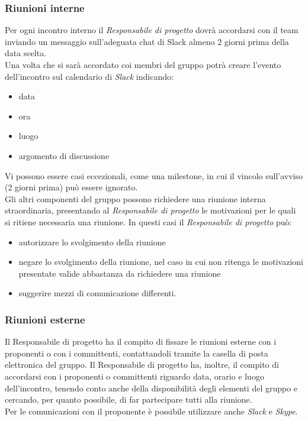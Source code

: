 \subsubsection{Riunioni interne}
Per ogni incontro interno il \emph{ \emph{Responsabile}  di progetto} dovrà
accordarsi con il team inviando un messaggio sull'adeguata chat di
Slack almeno 2 giorni prima della data scelta.\\ 
Una volta che si sarà accordato coi membri del gruppo potrà creare l'evento dell'incontro sul calendario di \emph{Slack} indicando:
\begin{itemize}
	\item data\item ora \item luogo\item argomento di discussione
\end{itemize}
Vi possono essere casi eccezionali, come una milestone, in cui il vincolo sull'avviso (2 giorni prima) può essere ignorato.\\
Gli altri componenti del gruppo possono richiedere una riunione
interna straordinaria, presentando al \emph{ \emph{Responsabile}  di
	progetto} le motivazioni per le quali si ritiene necessaria una
riunione. In questi casi il \emph{ \emph{Responsabile}  di progetto} può: 
\begin{itemize}
	\item autorizzare lo svolgimento della riunione
	\item negare lo
	svolgimento della riunione, nel caso in cui non ritenga le 
	motivazioni presentate valide abbastanza da richiedere una
	riunione
	\item suggerire mezzi di comunicazione differenti. 
\end{itemize}

\subsubsection{Riunioni esterne}
Il Responsabile di progetto ha il compito di fissare le riunioni esterne con i proponenti o con i
committenti, contattandoli tramite la casella di posta elettronica del gruppo.
Il Responsabile di progetto ha, inoltre, il compito di accordarsi con i proponenti o committenti riguardo data, orario e luogo dell'incontro, tenendo conto anche della disponibilità degli elementi del gruppo e cercando, per quanto possibile, di far partecipare tutti alla riunione. \\
Per le comunicazioni con il proponente è possibile utilizzare anche \emph{Slack} e \emph{Skype}.


